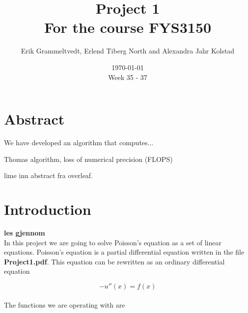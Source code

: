 \documentclass{article}
\begin{document}
\addtocounter{page}{0}

\title{Project 1 \\
      \large For the course FYS3150}
\date{\today \\
    \vspace{1mm}
    \large Week 35 - 37}

\author{Erik Grammeltvedt, Erlend Tiberg North and Alexandra Jahr Kolstad}

\maketitle

\vspace{1cm}

\tableofcontents



\section{Abstract} \label{Abstract}

We have developed an algorithm that computes...

Thomas algorithm, loss of numerical precision (FLOPS)

{\large lime inn abstract fra overleaf.}


\vspace{1cm}

\section{Introduction} \label{Introduction}

{\large \bf les gjennom} \\

In this project we are going to solve Poisson's equation as a set of linear equations. Poisson's equation is a partial differential equation written in the file \textbf{Project1.pdf}. This equation can be rewritten as an ordinary differential equation

\begin{equation}
  - u''(x) = f(x)   \label{eq:u(x)diffeq}
\end{equation} \\

The functions we are operating with are
\end{document}
